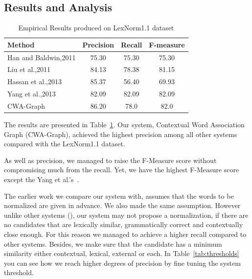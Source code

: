 \documentclass[preprint,review,12pt]{elsarticle}
\begin{document}
\subsection{Results and Analysis}

\begin{table}[thb]
  \centering
  \begin{tabular}[t]{lccc}
    \hline
    Method & Precision & Recall & F-measure \\
    \hline
    Han and Baldwin,2011 & 75.30 & 75.30 & 75.30 \\
    Liu et al.,2011 & 84.13 & 78.38 & 81.15 \\
    Hassan et al.,2013 & 85.37 & 56.40 & 69.93 \\
    Yang et al.,2013 & 82.09 & 82.09 & 82.09 \\
    CWA-Graph   & 86.20 & 78.0 & 82.0 \\
    \hline
  \end{tabular}
  \caption{Empirical Results produced on LexNorm1.1 dataset}
  \label{tab:results}
\end{table}

The results are presented in Table~\ref{tab:results}. Our system, Contextual Word Association Graph (CWA-Graph), achieved the highest precision among all other systems compared with the LexNorm1.1 dataset.

As well as precision, we managed to raise the F-Measure score without compromising much from the recall. Yet, we have the highest F-Measure score except the Yang et al.'s~\cite{DBLP:conf/wsdm/YangL11}.

The earlier work we compare our system with, assumes that the words to be normalized are given in advance. We also made the same assumption. However unlike other systems (\cite{DBLP:conf/wsdm/YangL11, liu2012broad, Han:2011:LNS:2002472.2002520}), our system may not propose a normalization, if there are no candidates that are lexically similar, grammatically correct and contextually close enough. For this reason we managed to achieve a higher recall compared to other systems. Besides, we make sure that the candidate has a minimum similarity either contextual, lexical, external or each. In Table~\ref{tab:thresholds} you can see how we reach higher degrees of precision by fine tuning the system threshold.
\end{document}
